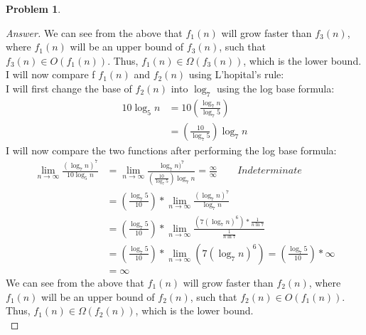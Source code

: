 \documentclass[11pt]{article}
\theoremstyle{definition}
\theoremstyle{definition}
\newtheorem{required}{Problem}
\theoremstyle{definition}
\begin{document}
\begin{required}
\begin{enumerate} [label=(\alph*)]
\begin{proof}[Answer]
We can see from the above that $f_1(n)$ will grow faster than $f_3(n)$, where $f_1(n)$ will be an upper bound of $f_3(n)$, such that $f_3(n) \in O(f_1(n))$. Thus, $f_1(n) \in \Omega(f_3(n))$, which is the lower bound. \\

I will now compare f $f_1(n)$ and $f_2(n)$ using L'hopital's rule:\\
I will first change the base of $f_2(n)$ into $\log_7$ using the log base formula: 
\begin{align*}
10\log_5n &= 10(\frac{\log_7n}{\log_7 5}) \\
&= (\frac{10}{\log_7 5})\log_7 n
\end{align*}
I will now compare the two functions after performing the log base formula: \\
\begin{align*}
\lim_{n \to \infty} \frac{(\log_7 n)^7}{10\log_5n} &= \lim_{n \to \infty} \frac{\log_7 n)^7}{(\frac{10}{\log_7 5})\log_7 n}  = \frac{\infty}{\infty} \qquad Indeterminate  \\
&= (\frac{\log_7 5}{10}) * \lim_{n \to \infty} \frac{(\log_7 n)^7}{\log_7 n}\\
&= (\frac{\log_7 5}{10}) * \lim_{n \to \infty} \frac{(7(\log_7 n)^6) * \frac{1}{n\ln7}}{\frac{1}{n\ln7}}\\
&= (\frac{\log_7 5}{10}) * \lim_{n \to \infty} (7(\log_7 n)^6) = (\frac{\log_7 5}{10})  * \infty\\
&= \infty
\end{align*} 
We can see from the above that $f_1(n)$ will grow faster than $f_2(n)$, where $f_1(n)$ will be an upper bound of $f_2(n)$, such that $f_2(n) \in O(f_1(n))$. Thus, $f_1(n) \in \Omega(f_2(n))$, which is the lower bound. \\


\end{proof}
\end{enumerate}
\end{required}
\end{document}
